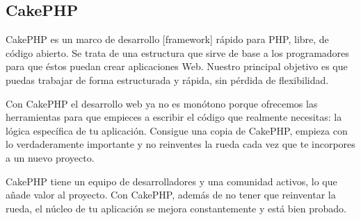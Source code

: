 \subsection{CakePHP}
\setlength{\parskip}{5mm}
CakePHP es un marco de desarrollo [framework] rápido para PHP, libre, de código abierto. Se trata de una estructura que sirve de base a los programadores para que éstos puedan crear aplicaciones Web. Nuestro principal objetivo es que puedas trabajar de forma estructurada y rápida, sin pérdida de flexibilidad.

Con CakePHP el desarrollo web ya no es monótono porque ofrecemos las herramientas para que empieces a escribir el código que realmente necesitas: la lógica específica de tu aplicación. Consigue una copia de CakePHP, empieza con lo verdaderamente importante y no reinventes la rueda cada vez que te incorpores a un nuevo proyecto.

CakePHP tiene un equipo de desarrolladores y una comunidad activos, lo que añade valor al proyecto. Con CakePHP, además de no tener que reinventar la rueda, el núcleo de tu aplicación se mejora constantemente y está bien probado.

